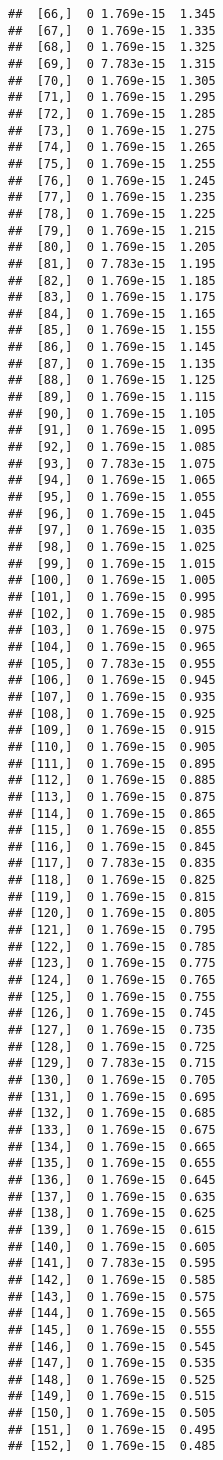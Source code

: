 \documentclass[]{book}
\begin{document}
\begin{verbatim}
##  [66,]  0 1.769e-15  1.345
##  [67,]  0 1.769e-15  1.335
##  [68,]  0 1.769e-15  1.325
##  [69,]  0 7.783e-15  1.315
##  [70,]  0 1.769e-15  1.305
##  [71,]  0 1.769e-15  1.295
##  [72,]  0 1.769e-15  1.285
##  [73,]  0 1.769e-15  1.275
##  [74,]  0 1.769e-15  1.265
##  [75,]  0 1.769e-15  1.255
##  [76,]  0 1.769e-15  1.245
##  [77,]  0 1.769e-15  1.235
##  [78,]  0 1.769e-15  1.225
##  [79,]  0 1.769e-15  1.215
##  [80,]  0 1.769e-15  1.205
##  [81,]  0 7.783e-15  1.195
##  [82,]  0 1.769e-15  1.185
##  [83,]  0 1.769e-15  1.175
##  [84,]  0 1.769e-15  1.165
##  [85,]  0 1.769e-15  1.155
##  [86,]  0 1.769e-15  1.145
##  [87,]  0 1.769e-15  1.135
##  [88,]  0 1.769e-15  1.125
##  [89,]  0 1.769e-15  1.115
##  [90,]  0 1.769e-15  1.105
##  [91,]  0 1.769e-15  1.095
##  [92,]  0 1.769e-15  1.085
##  [93,]  0 7.783e-15  1.075
##  [94,]  0 1.769e-15  1.065
##  [95,]  0 1.769e-15  1.055
##  [96,]  0 1.769e-15  1.045
##  [97,]  0 1.769e-15  1.035
##  [98,]  0 1.769e-15  1.025
##  [99,]  0 1.769e-15  1.015
## [100,]  0 1.769e-15  1.005
## [101,]  0 1.769e-15  0.995
## [102,]  0 1.769e-15  0.985
## [103,]  0 1.769e-15  0.975
## [104,]  0 1.769e-15  0.965
## [105,]  0 7.783e-15  0.955
## [106,]  0 1.769e-15  0.945
## [107,]  0 1.769e-15  0.935
## [108,]  0 1.769e-15  0.925
## [109,]  0 1.769e-15  0.915
## [110,]  0 1.769e-15  0.905
## [111,]  0 1.769e-15  0.895
## [112,]  0 1.769e-15  0.885
## [113,]  0 1.769e-15  0.875
## [114,]  0 1.769e-15  0.865
## [115,]  0 1.769e-15  0.855
## [116,]  0 1.769e-15  0.845
## [117,]  0 7.783e-15  0.835
## [118,]  0 1.769e-15  0.825
## [119,]  0 1.769e-15  0.815
## [120,]  0 1.769e-15  0.805
## [121,]  0 1.769e-15  0.795
## [122,]  0 1.769e-15  0.785
## [123,]  0 1.769e-15  0.775
## [124,]  0 1.769e-15  0.765
## [125,]  0 1.769e-15  0.755
## [126,]  0 1.769e-15  0.745
## [127,]  0 1.769e-15  0.735
## [128,]  0 1.769e-15  0.725
## [129,]  0 7.783e-15  0.715
## [130,]  0 1.769e-15  0.705
## [131,]  0 1.769e-15  0.695
## [132,]  0 1.769e-15  0.685
## [133,]  0 1.769e-15  0.675
## [134,]  0 1.769e-15  0.665
## [135,]  0 1.769e-15  0.655
## [136,]  0 1.769e-15  0.645
## [137,]  0 1.769e-15  0.635
## [138,]  0 1.769e-15  0.625
## [139,]  0 1.769e-15  0.615
## [140,]  0 1.769e-15  0.605
## [141,]  0 7.783e-15  0.595
## [142,]  0 1.769e-15  0.585
## [143,]  0 1.769e-15  0.575
## [144,]  0 1.769e-15  0.565
## [145,]  0 1.769e-15  0.555
## [146,]  0 1.769e-15  0.545
## [147,]  0 1.769e-15  0.535
## [148,]  0 1.769e-15  0.525
## [149,]  0 1.769e-15  0.515
## [150,]  0 1.769e-15  0.505
## [151,]  0 1.769e-15  0.495
## [152,]  0 1.769e-15  0.485

\end{verbatim}
\end{document}
